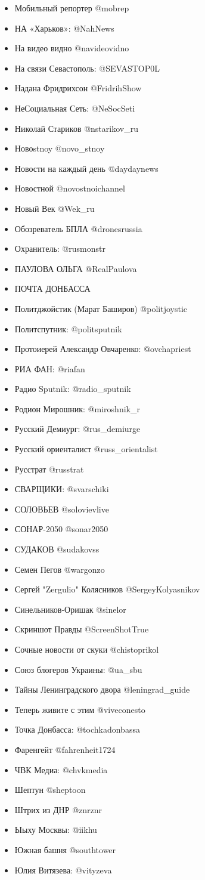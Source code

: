 \documentclass[a4paper,11pt]{book}
\begin{document}
\begin{itemize}
\item Мобильный репортер @mobrep 
\item НА «Харьков»: @NahNews 
\item На видео видно @navideovidno
\item На связи Севастополь: @SEVASTOP0L
\item Надана Фридрихсон @FridrihShow 
\item НеСоциальная Сеть: @NeSocSeti
\item Николай Стариков @nstarikov\_ru
\item Новоstnoy @novo\_stnoy
\item Новости на каждый день @daydaynews
\item Новостной @novostnoichannel
\item Новый Век @Wek\_ru
\item Обозреватель БПЛА @dronesrussia
\item Охранитель: @rusmonstr
\item ПАУЛОВА ОЛЬГА @RealPaulova  
\item ПОЧТА ДОНБАССА 
\item Политджойстик (Марат Баширов) @politjoystic
\item Политспутник: @politsputnik
\item Протоиерей Александр Овчаренко: @ovchapriest
\item РИА ФАН: @riafan
\item Радио Sputnik: @radio\_sputnik
\item Родион Мирошник: @miroshnik\_r 
\item Русский Демиург: @rus\_demiurge
\item Русский ориенталист @russ\_orientalist
\item Русстрат @russtrat
\item СВАРЩИКИ: @svarschiki
\item СОЛОВЬЕВ @solovievlive
\item СОНАР-2050 @sonar2050
\item СУДАКОВ @sudakovss
\item Семен Пегов @wargonzo 
\item Сергей "Zergulio" Колясников @SergeyKolyasnikov 
\item Синельников-Оришак @sinelor
\item Скриншот Правды @ScreenShotTrue
\item Сочные новости от скуки @chistoprikol
\item Союз блогеров Украины: @ua\_sbu 
\item Тайны Ленинградского двора @leningrad\_guide
\item Теперь живите с этим @viveconesto
\item Точка Донбасса: @tochkadonbassa
\item Фаренгейт @fahrenheit1724
\item ЧВК Медиа: @chvkmedia
\item Шептун @sheptoon
\item Штрих из ДНР @znrznr 
\item Ыыху Москвы: @iikhu
\item Южная башня @southtower
\item Юлия Витязева: @vityzeva
\end{itemize}
\end{document}
